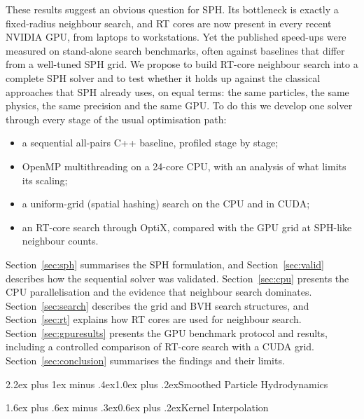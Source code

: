 \documentclass[conference]{IEEEtran}
\makeatletter
\renewcommand\section{\@startsection{section}{1}{\z@}%
  {2.2ex plus 1ex minus .4ex}{1.0ex plus .2ex}{\normalfont\large\bfseries}}
\renewcommand\subsection{\@startsection{subsection}{2}{\z@}%
  {1.6ex plus .6ex minus .3ex}{0.6ex plus .2ex}{\normalfont\normalsize\bfseries}}
\makeatother
\begin{document}
These results suggest an obvious question for SPH. Its bottleneck is exactly a fixed-radius neighbour search, and RT cores are now present in every recent NVIDIA GPU, from laptops to workstations. Yet the published speed-ups were measured on stand-alone search benchmarks, often against baselines that differ from a well-tuned SPH grid. We propose to build RT-core neighbour search into a complete SPH solver and to test whether it holds up against the classical approaches that SPH already uses, on equal terms: the same particles, the same physics, the same precision and the same GPU. To do this we develop one solver through every stage of the usual optimisation path:
\begin{itemize}
\item a sequential all-pairs C++ baseline, profiled stage by stage;
\item OpenMP multithreading on a 24-core CPU, with an analysis of what limits its scaling;
\item a uniform-grid (spatial hashing) search on the CPU and in CUDA;
\item an RT-core search through OptiX, compared with the GPU grid at SPH-like neighbour counts.
\end{itemize}
Section~\ref{sec:sph} summarises the SPH formulation, and Section~\ref{sec:valid} describes how the sequential solver was validated. Section~\ref{sec:cpu} presents the CPU parallelisation and the evidence that neighbour search dominates. Section~\ref{sec:search} describes the grid and BVH search structures, and Section~\ref{sec:rt} explains how RT cores are used for neighbour search.
Section~\ref{sec:gpuresults} presents the GPU benchmark protocol and results, including a controlled comparison of RT-core search with a CUDA grid. Section~\ref{sec:conclusion} summarises the findings and their limits.

\section{Smoothed Particle Hydrodynamics}\label{sec:sph}

\subsection{Kernel Interpolation}
\end{document}
